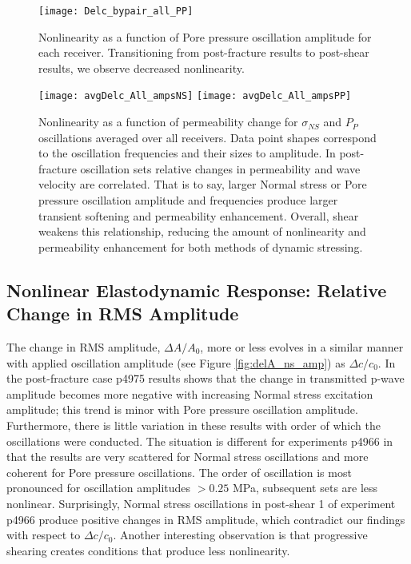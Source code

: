 \clearpage

\begin{figure}[ht]
	\centering
	\texttt{[image: Delc\_bypair\_all\_PP]}
	\caption{Nonlinearity as a function of Pore pressure oscillation amplitude for each receiver. Transitioning from post-fracture results to post-shear results, we observe decreased nonlinearity.}
		\label{fig:delc_plots_pp}
\end{figure}

\clearpage


\begin{figure}[ht]
	\centering
	\texttt{[image: avgDelc\_All\_ampsNS]}
	\texttt{[image: avgDelc\_All\_ampsPP]}
	\caption{Nonlinearity as a function of permeability change for $ \sigma_{NS} $ and $ P_P $ oscillations averaged over all receivers. Data point shapes correspond to the oscillation frequencies and their sizes to amplitude. In post-fracture oscillation sets relative changes in permeability and wave velocity are correlated. That is to say, larger Normal stress or Pore pressure oscillation amplitude and frequencies produce larger transient softening and permeability enhancement. Overall, shear weakens this relationship, reducing the amount of nonlinearity and permeability enhancement for both methods of dynamic stressing. }
	\label{fig:delc_plots2}
\end{figure}

\clearpage


\subsection{Nonlinear Elastodynamic Response: Relative Change in RMS Amplitude}
The change in RMS amplitude, $ \Delta A/ A_0 $, more or less evolves in a similar manner with applied oscillation amplitude (see Figure \ref{fig:delA_ns_amp}) as $ \Delta c/c_0 $. In the post-fracture case p4975 results shows that the change in transmitted p-wave amplitude becomes more negative with increasing Normal stress excitation amplitude; this trend is minor with Pore pressure oscillation amplitude. Furthermore, there is little variation in these results with order of which the oscillations were conducted. The situation is different for experiments p4966 in that the results are very scattered for Normal stress oscillations and more coherent for Pore pressure oscillations. The order of oscillation is most pronounced for oscillation amplitudes $ > 0.25 $ MPa, subsequent sets are less nonlinear. Surprisingly, Normal stress oscillations in post-shear 1 of experiment p4966 produce positive changes in RMS amplitude, which contradict our findings with respect to $ \Delta c/c_0 $. Another interesting observation is that progressive shearing creates conditions that produce less nonlinearity. 

